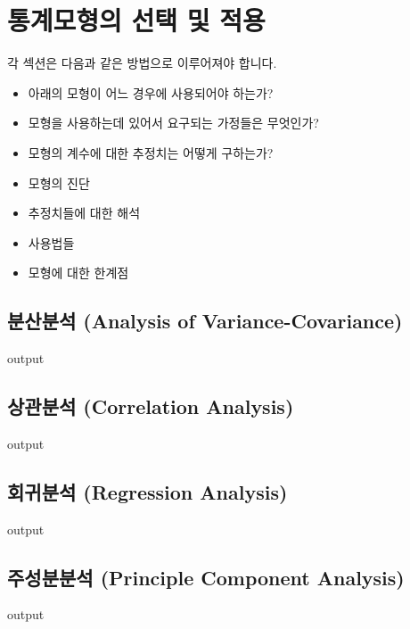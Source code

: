 \documentclass{report}
\begin{document}
%
%
%

\chapter{통계모형의 선택 및 적용}

각 섹션은 다음과 같은 방법으로 이루어져야 합니다. 
\begin{itemize}
\item 아래의 모형이 어느 경우에 사용되어야 하는가?
\item 모형을 사용하는데 있어서 요구되는 가정들은 무엇인가?
\item 모형의 계수에 대한 추정치는 어떻게 구하는가?
\item 모형의 진단
\item 추정치들에 대한 해석
\item 사용법들 
\item 모형에 대한 한계점
\end{itemize}

\section{분산분석 (Analysis of Variance-Covariance)}
\begin{Schunk}
\begin{Soutput}
output
\end{Soutput}
\end{Schunk}

\section{상관분석 (Correlation Analysis) }
\begin{Schunk}
\begin{Soutput}
output
\end{Soutput}
\end{Schunk}

\section{회귀분석 (Regression Analysis) }
\begin{Schunk}
\begin{Soutput}
output
\end{Soutput}
\end{Schunk}

\section{주성분분석 (Principle Component Analysis)}
\begin{Schunk}
\begin{Soutput}
output
\end{Soutput}
\end{Schunk}
\end{document}
